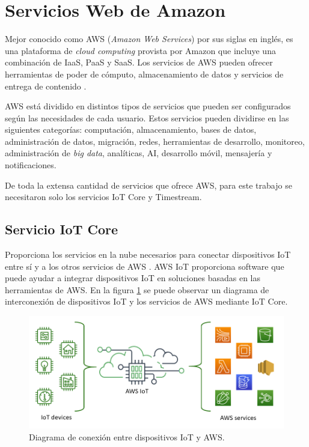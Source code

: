 \section{Servicios Web de Amazon}
Mejor conocido como AWS (\textit{Amazon Web Services}) por sus siglas en inglés, es una plataforma de \textit{cloud computing} provista por Amazon que incluye una combinación de IaaS, PaaS y SaaS. Los servicios de AWS pueden ofrecer herramientas de poder de cómputo, almacenamiento de datos y servicios de entrega de contenido \cite{aws_info}.

AWS está dividido en distintos tipos de servicios que pueden ser configurados según las necesidades de cada usuario. Estos servicios pueden dividirse en las siguientes categorías: computación, almacenamiento, bases de datos, administración de datos, migración, redes, herramientas de desarrollo, monitoreo, administración de \textit{big data}, analíticas, AI, desarrollo móvil, mensajería y notificaciones.

De toda la extensa cantidad de servicios que ofrece AWS, para este trabajo se necesitaron solo los servicios IoT Core y Timestream.

\subsection{Servicio IoT Core}
Proporciona los servicios en la nube necesarios para conectar dispositivos IoT entre sí y a los otros servicios de AWS \cite{iot_info}. AWS IoT proporciona software que puede ayudar a integrar dispositivos IoT en soluciones basadas en las herramientas de AWS. En la figura \ref{fig:aws_iot} se puede observar un diagrama de interconexión de dispositivos IoT y los servicios de AWS mediante IoT Core.

\begin{figure}[h]
	\centering
	\includegraphics[scale=0.5]{./Figures/aws_iot.png}
	\caption{Diagrama de conexión entre dispositivos IoT y AWS\protect\footnotemark.}
	\label{fig:aws_iot}
\end{figure}

